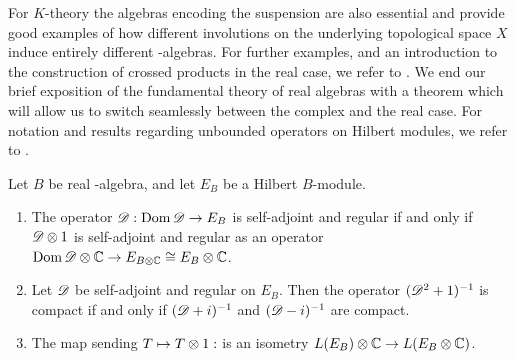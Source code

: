 For $K$-theory the algebras encoding the suspension are also essential and provide good examples of how different involutions on the underlying topological space $X$ induce entirely different \Cstar-algebras. 
For further examples, and an introduction to the construction of crossed products in the real case, we refer to \cite[Ch. 1]{schroder}. We end our brief exposition of the fundamental theory of real \Cstar algebras with a theorem which will allow us to switch seamlessly between the complex and the real case. For notation and results regarding unbounded operators on Hilbert modules, we refer to \cite[Chapter 9, Chapter 10]{lance95}.
\begin{theorem}\label{complextoreal}
	Let $B$ be real \Cstar-algebra, and let $E_B$ be a Hilbert $B$-module.
\begin{enumerate}
		\item
			The operator $\mathscr{D}:\operatorname{Dom} \mathscr{D} \to E_B$ is self-adjoint and regular if and only if $\mathscr{D}\otimes 1$ is self-adjoint and regular as an operator $\operatorname{Dom} \mathscr{D} \otimes \mathbb{C} \to E_{B \otimes \mathbb{C}}\cong E_{B}\otimes \mathbb{C}$. 
		\item Let $\mathscr{D}$ be self-adjoint and regular on $E_B$. Then the operator $(\mathscr{D}^2+1)^{-1}$ is compact if and only if $(\mathscr{D}+i)^{-1}$ and $(\mathscr{D}-i)^{-1}$ are compact.
		\item The map sending $T\mapsto T\otimes 1:$ is an isometry $L(E_B)\otimes \mathbb{C} \to L(E_B \otimes \mathbb{C})$. 
\end{enumerate}
\end{theorem}
